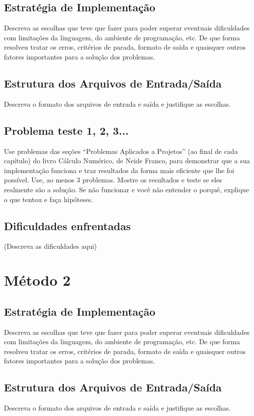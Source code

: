 \documentclass[a4paper,12pt]{article}
\begin{document}
\subsection{Estratégia de Implementação}
Descreva as escolhas que teve que fazer para poder superar eventuais dificuldades com limitações da linguagem, do ambiente de programação, etc.
De que forma resolveu tratar os erros, critérios de parada, formato de saída e quaisquer outros fatores importantes para a solução dos problemas.

\subsection{Estrutura dos Arquivos de Entrada/Saída}
Descreva o formato dos arquivos de entrada e saída e justifique as escolhas.

\subsection{Problema teste 1, 2, 3...}
Use problemas das seções “Problemas Aplicados a Projetos” (ao final de cada capítulo) do livro Cálculo Numérico, de Neide Franco, para demonstrar que a sua implementação funciona e traz resultados da forma mais eficiente que lhe foi possível. Use, ao menos 3 problemas. Mostre os resultados e teste se eles realmente são a solução. Se não funcionar e você não entender o porquê, explique o que tentou e faça hipóteses.

\subsection{Dificuldades enfrentadas}
(Descreva as dificuldades aqui)

\newpage
\section{Método 2}

\subsection{Estratégia de Implementação}
Descreva as escolhas que teve que fazer para poder superar eventuais dificuldades com limitações da linguagem, do ambiente de programação, etc.
De que forma resolveu tratar os erros, critérios de parada, formato de saída e quaisquer outros fatores importantes para a solução dos problemas.

\subsection{Estrutura dos Arquivos de Entrada/Saída}
Descreva o formato dos arquivos de entrada e saída e justifique as escolhas.
\end{document}
